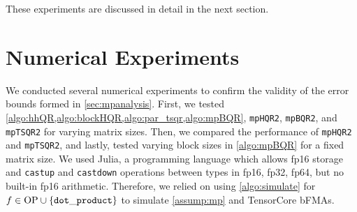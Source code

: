 \documentclass[review,onefignum,onetabnum]{siamart190516}
\begin{document}
These experiments are discussed in detail in the next section.%





\section{Numerical Experiments}\label{sec:NE}
%

We conducted several numerical experiments to confirm the validity of the error bounds formed in \cref{sec:mpanalysis}.
First, we tested \cref{algo:hhQR,algo:blockHQR,algo:par_tsqr,algo:mpBQR}, {\tt mpHQR2}, {\tt mpBQR2}, and {\tt mpTSQR2} for varying matrix sizes.
Then, we compared the performance of {\tt mpHQR2} and {\tt mpTSQR2}, and lastly, tested varying block sizes in \cref{algo:mpBQR} for a fixed matrix size. 
We used Julia, a programming language which allows fp16 storage and {\tt castup} and {\tt castdown} operations between types in {fp16, fp32, fp64}, but no built-in fp16 arithmetic.
Therefore, we relied on using \cref{algo:simulate} for $f\in \text{OP} \cup\{{\tt dot\_product}\}$ to simulate \cref{assump:mp} and TensorCore bFMAs.\par
\end{document}
